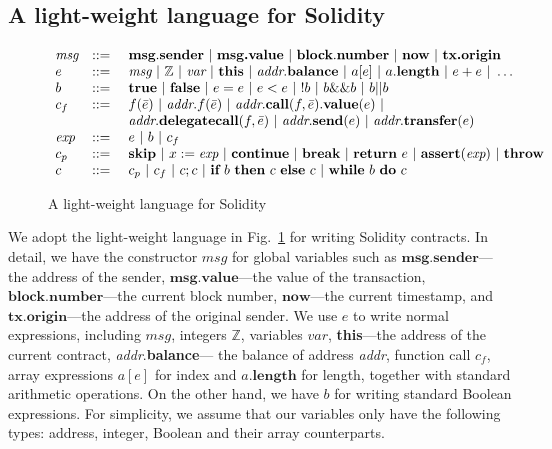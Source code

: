 \subsection{A light-weight language for Solidity}
\begin{figure}
$
\begin{array}{lcl}
\textit{msg}&::=~&\textbf{msg}.\textbf{sender}~|~\textbf{msg.value}~|~\textbf{block}.\textbf{number}~|~\textbf{now}~|~\textbf{tx.origin}\\
e&::=~&\textit{msg}~|~\mathbb{Z}~|~\textit{var}~|~\textbf{this}~|~\textit{addr}.\textbf{balance}~|~a[e]~|~a.\textbf{length}~|~e + e~|~ \ldots\\
b&::=~&\textbf{true}~|~\textbf{false}~|~ e = e~|~ e < e ~|~ !b~|~ b \&\& b  ~|~ b || b
\\
c_f&::=~&f(\bar{e})~|~\textit{addr}.f(\bar{e})~|~\textit{addr}.\textbf{call}(f,\bar{e}).\textbf{value}(e)~|~
\\
&&\textit{addr}.\textbf{delegatecall}(f,\bar{e})~|~\textit{addr}.\textbf{send}(e)~|~\textit{addr}.\textbf{transfer}(e)
\\
\textit{exp}&::=~& e~|~b~|~c_f
\\
c_p&::=~&\textbf{skip}~|~x:=\textit{exp}~|~\textbf{continue}~|~\textbf{break}~|~\textbf{return}~e~|~
\textbf{assert}(\textit{exp})~|~\textbf{throw}
\\
c&::=~&c_p~|~c_f~|~c;c~|~\textbf{if}~b~\textbf{then}~c~\textbf{else}~c~|~\textbf{while}~b~\textbf{do}~c
\end{array}
$
\caption{A light-weight language for Solidity}\label{fig:lang}
\end{figure}


We adopt the light-weight language in Fig.~\ref{fig:lang} for writing Solidity contracts. In detail, we have the constructor $\textit{msg}$ for global variables such as $\textbf{msg.sender}$---the address of the sender, $\textbf{msg.value}$---the value of the transaction, $\textbf{block.number}$---the current block number, $\textbf{now}$---the current timestamp, and $\textbf{tx.origin}$---the address of the original sender. We use $e$ to write normal expressions, including $\textit{msg}$, integers $\mathbb{Z}$, variables $\textit{var}$,  \textbf{this}---the address of the current contract, \textit{addr}.\textbf{balance}--- the balance of address \textit{addr}, function call $c_f$, array expressions $a[e]$ for index  and $a.\textbf{length}$ for length, together with standard arithmetic operations. On the other hand, we have $b$ for writing standard  Boolean expressions. For simplicity, we assume that our variables only have the following types: address, integer, Boolean and their array counterparts.


